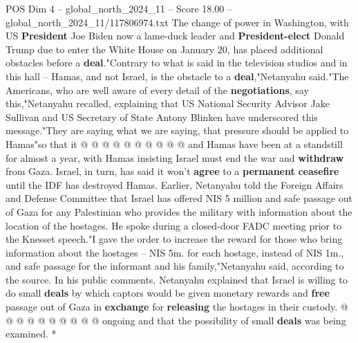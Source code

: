 \begin{textsample}{POS Dim 4 – global\_north\_2024\_11 – Score 18.00 – global\_north\_2024\_11/117806974.txt}
The change of power in Washington, with US \textbf{President} Joe Biden now a lame-duck leader and \textbf{President-elect} Donald Trump due to enter the White House on January 20, has placed additional obstacles before a \textbf{deal}."Contrary to what is said in the television studios and in this hall -- Hamas, and not Israel, is the obstacle to a \textbf{deal},"Netanyahu said."The Americans, who are well aware of every detail of the \textbf{negotiations}, say this,"Netanyahu recalled, explaining that US National Security Advisor Jake Sullivan and US Secretary of State Antony Blinken have underscored this message."They are saying what we are saying, that pressure should be applied to Hamas"so that it @ @ @ @ @ @ @ @ @ @ and Hamas have been at a standstill for almost a year, with Hamas insisting Israel must end the war and \textbf{withdraw} from Gaza.
Israel, in turn, has said it won't \textbf{agree} to a \textbf{permanent} \textbf{ceasefire} until the IDF has destroyed Hamas.
Earlier, Netanyahu told the Foreign Affairs and Defense Committee that Israel has offered NIS 5 million and safe passage out of Gaza for any Palestinian who provides the military with information about the location of the hostages.
He spoke during a closed-door FADC meeting prior to the Knesset speech."I gave the order to increase the reward for those who bring information about the hostages -- NIS 5m. for each hostage, instead of NIS 1m., and safe passage for the informant and his family,"Netanyahu said, according to the source.
In his public comments, Netanyahu explained that Israel is willing to do small \textbf{deals} by which captors would be given monetary rewards and \textbf{free} passage out of Gaza in \textbf{exchange} for \textbf{releasing} the hostages in their custody. @ @ @ @ @ @ @ @ @ @ ongoing and that the possibility of small \textbf{deals} was being examined. *

\end{textsample}
